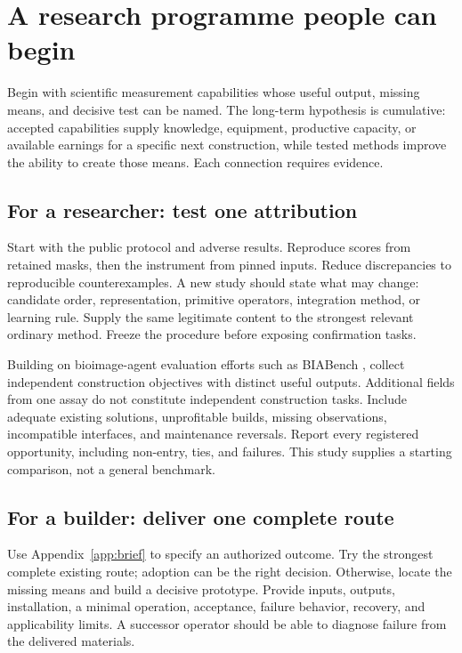 \clearpage
\section{A research programme people can begin}
\label{sec:programme}

Begin with scientific measurement capabilities whose useful output, missing means, and decisive test can be named. The long-term hypothesis is cumulative: accepted capabilities supply knowledge, equipment, productive capacity, or available earnings for a specific next construction, while tested methods improve the ability to create those means. Each connection requires evidence.

\subsection{For a researcher: test one attribution}

Start with the public protocol and adverse results. Reproduce scores from retained masks, then the instrument from pinned inputs. Reduce discrepancies to reproducible counterexamples. A new study should state what may change: candidate order, representation, primitive operators, integration method, or learning rule. Supply the same legitimate content to the strongest relevant ordinary method. Freeze the procedure before exposing confirmation tasks.

Building on bioimage-agent evaluation efforts such as BIABench \citep{pan2026}, collect independent construction objectives with distinct useful outputs. Additional fields from one assay do not constitute independent construction tasks. Include adequate existing solutions, unprofitable builds, missing observations, incompatible interfaces, and maintenance reversals. Report every registered opportunity, including non-entry, ties, and failures. This study supplies a starting comparison, not a general benchmark.

\subsection{For a builder: deliver one complete route}

Use Appendix~\ref{app:brief} to specify an authorized outcome. Try the strongest complete existing route; adoption can be the right decision. Otherwise, locate the missing means and build a decisive prototype. Provide inputs, outputs, installation, a minimal operation, acceptance, failure behavior, recovery, and applicability limits. A successor operator should be able to diagnose failure from the delivered materials.

